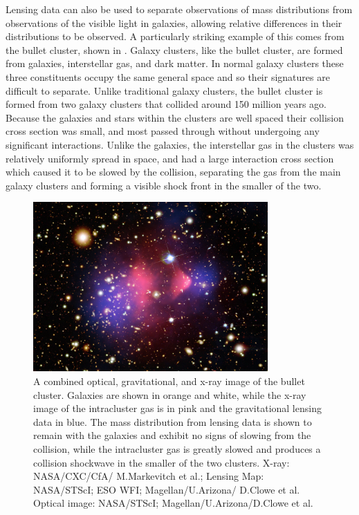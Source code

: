 Lensing data can also be used to separate observations of mass distributions from observations of the visible light in galaxies, allowing relative differences in their distributions to be observed. 
A particularly striking example of this comes from the bullet cluster, shown in . 
Galaxy clusters, like the bullet cluster, are formed from galaxies, interstellar gas, and dark matter.
In normal galaxy clusters these three constituents occupy the same general space and so their signatures are difficult to separate.
Unlike traditional galaxy clusters, the bullet cluster is formed from two galaxy clusters that collided around 150 million years ago. 
Because the galaxies and stars within the clusters are well spaced their collision cross section was small, and most passed through without undergoing any significant interactions.
Unlike the galaxies, the interstellar gas in the clusters was relatively uniformly spread in space, and had a large interaction cross section which caused it to be slowed by the collision, separating the gas from the main galaxy clusters and forming a visible shock front in the smaller of the two.

\begin{figure}[htpb]
	\centering
	\includegraphics[width=0.8\textwidth]{figures/bullet_cluster.jpg}
	\caption[Visible, x-ray, and gravitational lensing images of the bullet cluster]{ A combined optical, gravitational, and x-ray image of the bullet cluster. Galaxies are shown in orange and white, while the x-ray image of the intracluster gas is in pink and the gravitational lensing data in blue. The mass distribution from lensing data is shown to remain with the galaxies and exhibit no signs of slowing from the collision, while the intracluster gas is greatly slowed and produces a collision shockwave in the smaller of the two clusters. X-ray: NASA/CXC/CfA/ M.Markevitch et al.; Lensing Map: NASA/STScI; ESO WFI; Magellan/U.Arizona/ D.Clowe et al. Optical image: NASA/STScI; Magellan/U.Arizona/D.Clowe et al.}
	\label{fig:bullet}
\end{figure}

